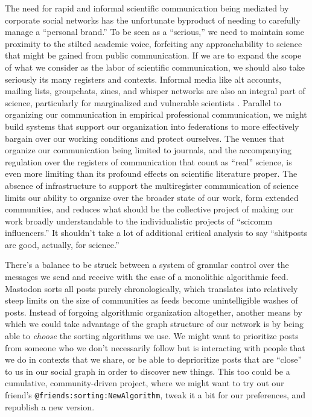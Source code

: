 The need for rapid and informal scientific communication being mediated
by corporate social networks has the unfortunate byproduct of needing to
carefully manage a ``personal brand.'' To be seen as a ``serious,'' we
need to maintain some proximity to the stilted academic voice,
forfeiting any approachability to science that might be gained from
public communication. If we are to expand the scope of what we consider
as the labor of scientific communication, we should also take seriously
its many registers and contexts. Informal media like alt accounts,
mailing lists, groupchats, zines, and whisper networks are also an
integral part of science, particularly for marginalized and vulnerable
scientists \citep{jimenezBorderlandingAcademicResearchers2020} .
Parallel to organizing our communication in empirical professional
communication, we might build systems that support our organization into
federations to more effectively bargain over our working conditions and
protect ourselves. The venues that organize our communication being
limited to journals, and the accompanying regulation over the registers
of communication that count as ``real'' science, is even more limiting
than its profound effects on scientific literature proper. The absence
of infrastructure to support the multiregister communication of science
limits our ability to organize over the broader state of our work, form
extended communities, and reduces what should be the collective project
of making our work broadly understandable to the individualistic
projects of ``scicomm influencers.'' It shouldn't take a lot of
additional critical analysis to say ``shitposts are good, actually, for
science.''

There's a balance to be struck between a system of granular control over
the messages we send and receive with the ease of a monolithic
algorithmic feed. Mastodon sorts all posts purely chronologically, which
translates into relatively steep limits on the size of communities as
feeds become unintelligible washes of posts. Instead of forgoing
algorithmic organization altogether, another means by which we could
take advantage of the graph structure of our network is by being able to
\emph{choose} the sorting algorithms we use. We might want to prioritize
posts from someone who we don't necessarily follow but is interacting
with people that we do in contexts that we share, or be able to
deprioritize posts that are ``close'' to us in our social graph in order
to discover new things. This too could be a cumulative, community-driven
project, where we might want to try out our friend's
\texttt{@friends:sorting:NewAlgorithm}, tweak it a bit for our
preferences, and republish a new version.

